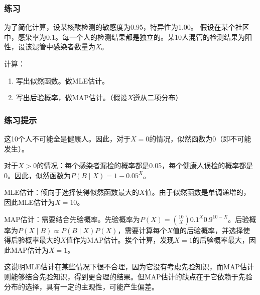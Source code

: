 \documentclass[aspectratio=1610]{ctexbeamer}
\begin{document}
\begin{frame}
    \frametitle{练习}

    为了简化计算，设某核酸检测的敏感度为0.95，特异性为1.00。
    假设在某个社区中，感染率为0.1。每一个人的检测结果都是独立的。某10人混管的检测结果为阳性，设该混管中感染者数量为$X$。

    计算：
    \begin{enumerate}
        \item 写出似然函数。做MLE估计。
        \item 写出后验概率，做MAP估计。（假设$X$遵从二项分布）
    \end{enumerate}

\end{frame}

\begin{frame}
    \frametitle{练习提示}

    这10个人不可能全是健康人。因此，对于$X=0$的情况，似然函数为0（即不可能发生）。
    
    对于$X>0$的情况：每个感染者漏检的概率都是0.05，每个健康人误检的概率都是0。因此，似然函数为$P(B \mid X) = 1 - 0.05^X$。

    MLE估计：倾向于选择使得似然函数最大的$X$值。由于似然函数是单调递增的，因此MLE估计为$X=10$。

    MAP估计：需要结合先验概率。先验概率为$P(X) = \binom{10}{X} 0.1^X 0.9^{10-X}$。后验概率为$P(X \mid B) \propto P(B \mid X) P(X)$，需要计算每个$X$值的后验概率，并选择使得后验概率最大的$X$值作为MAP估计。挨个计算，发现$X=1$的后验概率最大，因此MAP估计为$X=1$。

    \vspace{1em}

    这说明MLE估计在某些情况下很不合理，因为它没有考虑先验知识，而MAP估计则能够结合先验知识，得到更合理的结果。但MAP估计的缺点在于它依赖于先验分布的选择，具有一定的主观性，可能产生偏差。
    
\end{frame}
\end{document}
